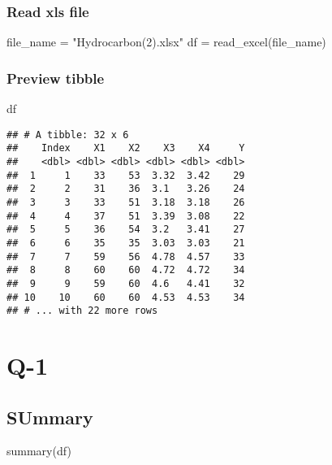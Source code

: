 \documentclass[
]{article}
\newenvironment{Shaded}{\begin{snugshade}}{\end{snugshade}}
\newcommand{\FunctionTok}[1]{\textcolor[rgb]{0.00,0.00,0.00}{#1}}
\newcommand{\NormalTok}[1]{#1}
\newcommand{\OtherTok}[1]{\textcolor[rgb]{0.56,0.35,0.01}{#1}}
\newcommand{\StringTok}[1]{\textcolor[rgb]{0.31,0.60,0.02}{#1}}
\begin{document}
\hypertarget{read-xls-file}{%
\subsubsection{Read xls file}\label{read-xls-file}}

\begin{Shaded}
\begin{Highlighting}[]
\NormalTok{file\_name }\OtherTok{=} \StringTok{"Hydrocarbon(2).xlsx"}
\NormalTok{df }\OtherTok{=} \FunctionTok{read\_excel}\NormalTok{(file\_name)}
\end{Highlighting}
\end{Shaded}

\hypertarget{preview-tibble}{%
\subsubsection{Preview tibble}\label{preview-tibble}}

\begin{Shaded}
\begin{Highlighting}[]
\NormalTok{df}
\end{Highlighting}
\end{Shaded}

\begin{verbatim}
## # A tibble: 32 x 6
##    Index    X1    X2    X3    X4     Y
##    <dbl> <dbl> <dbl> <dbl> <dbl> <dbl>
##  1     1    33    53  3.32  3.42    29
##  2     2    31    36  3.1   3.26    24
##  3     3    33    51  3.18  3.18    26
##  4     4    37    51  3.39  3.08    22
##  5     5    36    54  3.2   3.41    27
##  6     6    35    35  3.03  3.03    21
##  7     7    59    56  4.78  4.57    33
##  8     8    60    60  4.72  4.72    34
##  9     9    59    60  4.6   4.41    32
## 10    10    60    60  4.53  4.53    34
## # ... with 22 more rows
\end{verbatim}

\hypertarget{q-1}{%
\section{Q-1}\label{q-1}}

\hypertarget{summary}{%
\subsection{SUmmary}\label{summary}}

\begin{Shaded}
\begin{Highlighting}[]
\FunctionTok{summary}\NormalTok{(df)}
\end{Highlighting}
\end{Shaded}
\end{document}
